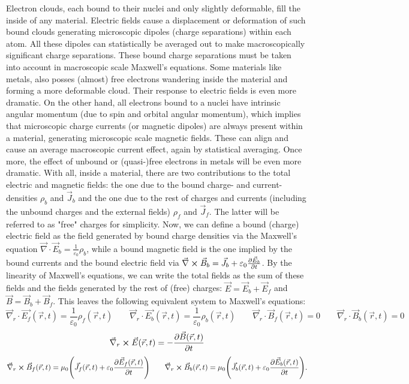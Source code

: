 \documentclass[11pt, a4paper, twoside]{article} %
\begin{document}
Electron clouds, each bound to their nuclei and only slightly deformable, fill the inside of any material. Electric fields cause a displacement or deformation of such bound clouds generating microscopic dipoles (charge separations) within each atom. All these dipoles can statistically be averaged out to make macroscopically significant charge separations. These bound charge separations must be taken into account in macroscopic scale Maxwell's equations. Some materials like metals, also posses (almost) free electrons wandering inside the material and forming a more deformable cloud. Their response to electric fields is even more dramatic. On the other hand, all electrons bound to a nuclei have intrinsic angular momentum (due to spin and orbital angular momentum), which implies that microscopic charge currents (or magnetic dipoles) are always present within a material, generating microscopic scale magnetic fields. These can align and cause an average macroscopic current effect, again by statistical averaging. Once more, the effect of unbound or (quasi-)free electrons in metals will be even more dramatic. With all, inside a material, there are two contributions to the total electric and magnetic fields: the one due to the bound charge- and current-densities $\rho_b$ and $\vec{J}_b$ and the one due to the rest of charges and currents (including the unbound charges and the external fields) $\rho_f$ and $\vec{J}_f$. The latter will be referred to as "free" charges for simplicity. Now,  we can define a bound (charge) electric field as the field generated by bound charge densities via the Maxwell's equation $\vec{\nabla}\cdot \vec{E}_b=\frac{1}{\varepsilon_0}\rho_b$, while a bound magnetic field is the one implied by the bound currents and the bound electric field via $\vec{\nabla}\cross \vec{B}_b=\vec{J}_b+\varepsilon_0\pdv{\vec{E}_b}{t}$. By the linearity of Maxwell's equations, we can write the total fields as the sum of these fields and the fields generated by the rest of (free) charges: $\vec{E}=\vec{E}_b+\vec{E}_f$ and $\vec{B}=\vec{B}_b+\vec{B}_f$. This leaves the following equivalent system to Maxwell's equations:
\begin{equation}\label{divBt}
\vec{\nabla}_r\cdot \vec{E_f}(\vec{r},t)=\frac{1}{\varepsilon_0}\rho_f(\vec{r},t) \quad  \quad\vec{\nabla}_r\cdot \vec{E_b}(\vec{r},t)=\frac{1}{\varepsilon_0}\rho_b(\vec{r},t) \quad \quad \vec{\nabla}_r\cdot \vec{B}_f(\vec{r},t)=0 \quad \quad \vec{\nabla}_r\cdot \vec{B}_b(\vec{r},t)=0 
\end{equation}
\begin{equation}\label{curlBt}
\vec{\nabla }_r\cross \vec{E}(\vec{r},t)=-\pdv{\vec{B}(\vec{r},t)}{t} 
\end{equation}
\begin{equation}\label{anotherone}
\vec{\nabla }_r\cross \vec{B}_f(\vec{r},t)=\mu_0\qty(\vec{J}_f(\vec{r},t)+\varepsilon_0\pdv{\vec{E}_f(\vec{r},t)}{t})\quad \quad  \vec{\nabla }_r\cross \vec{B}_b(\vec{r},t)=\mu_0\qty(\vec{J}_b(\vec{r},t)+\varepsilon_0\pdv{\vec{E}_b(\vec{r},t)}{t}).
\end{equation}
\end{document}
